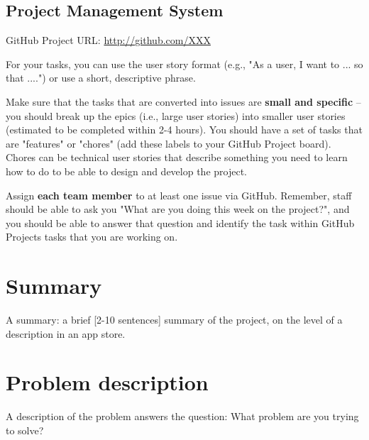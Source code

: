 \documentclass{article}
\begin{document}
\subsection*{Project Management System}
GitHub Project URL:
\url{http://github.com/XXX}

For your tasks, you can use the user story format (e.g., "As a user, I want to ... so that ....") or use a short, descriptive phrase.

Make sure that the tasks that are converted into issues are \textbf{small and specific} -- you should break up the epics (i.e., large user stories) into smaller user stories (estimated to be completed within 2-4 hours). You should have a set of tasks that are "features" or "chores" (add these labels to your GitHub Project board). Chores can be technical user stories that describe something you need to learn how to do to be able to design and develop the project.

Assign \textbf{each team member} to at least one issue via GitHub.
Remember, staff should be able to ask you "What are you doing this week on the project?", and you should be able to answer that question and identify the task within GitHub Projects tasks that you are working on.

%
\section{Summary}
A summary: a brief [2-10 sentences] summary of the project, on the level of a description in an app store.

\section{Problem description}
A description of the problem answers the question: What problem are you trying to solve?
\end{document}
